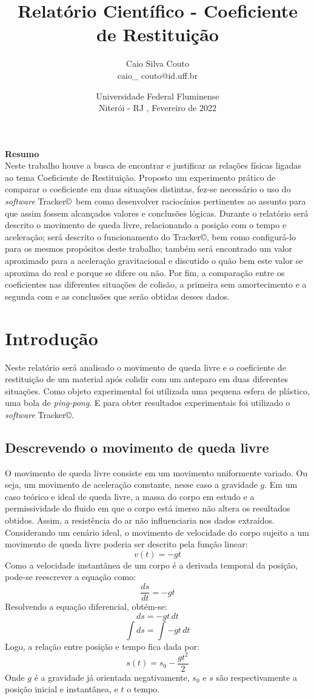\documentclass[a4paper, 12pt]{article}
\title{Relatório Científico - Coeficiente de Restituição}
\author{Caio Silva Couto \\ caio\_\! couto@id.uff.br}
\date{ \vspace{500pt} Universidade Federal Fluminense\\ Niterói - RJ ,  Fevereiro de 2022}
\begin{document}
	
	\maketitle
	\newpage		
		\noindent \textbf{\Large Resumo} \vspace{25pt} \\		
		\noindent Neste trabalho houve a busca de encontrar e justificar as relações físicas ligadas ao tema Coeficiente de Restituição. Proposto um experimento prático de comparar o coeficiente em duas situações distintas, fez-se necessário o uso do \textsl{software} Tracker\copyright \, bem como desenvolver raciocínios pertinentes ao assunto para que assim fossem alcançados valores e conclusões lógicas. Durante o relatório será descrito o movimento de queda livre, relacionando a posição com o tempo e aceleração; será descrito o funcionamento do Tracker\copyright, bem como configurá-lo para os mesmos propósitos deste trabalho; também será encontrado um valor aproximado para a aceleração gravitacional e discutido o quão bem este valor se aproxima do real e porque se difere ou não. Por fim, a comparação entre os coeficientes nas diferentes situações de colisão, a primeira sem amortecimento e a segunda com e as conclusões que serão obtidas desses dados.
	\newpage
	\tableofcontents 
	\newpage
	\listoffigures
	\newpage
	\listoftables
	\newpage
	\section{Introdução}
	Neste relatório será analisado o movimento de queda livre e o coeficiente de restituição de um material após colidir com um anteparo em duas diferentes situações. Como objeto experimental foi utilizada uma pequena esfera de plástico, uma bola de \textsl{ping-pong}. E para obter resultados experimentais foi utilizado o \textsl{software} Tracker\copyright.  \\		
		\subsection{Descrevendo o movimento de queda livre}
		O movimento de queda livre consiste em um movimento uniformente variado. Ou seja, um movimento de aceleração constante, nesse caso a gravidade $g$. Em um caso teórico e ideal de queda livre, a massa do corpo em estudo e a permissividade do fluido em que o corpo está imerso  não altera os resultados obtidos. Assim, a resistência do ar não influenciaria nos dados extraídos.\\
		Considerando um cenário ideal, o movimento de velocidade do corpo sujeito a um movimento de queda livre poderia ser descrito pela função linear:
		$$v(t)=-gt$$
		Como a velocidade instantânea de um corpo é a derivada temporal da posição, pode-se reescrever a equação como:
		$$\dfrac{ds}{dt}=-gt$$
		Resolvendo a equação diferencial, obtém-se:
		$$ds = -gt \, dt$$
		$$ \int ds = \int -gt \, dt $$
		Logo, a relação entre posição e tempo fica dada por:
		$$s(t) =s_0 - \dfrac{gt^2}{2}$$
		Onde $g$ é a gravidade já orientada negativamente, $s_0$ e $s$ são respectivamente a posição inicial e instantânea, e $t$ o tempo. \\
		
\end{document}
